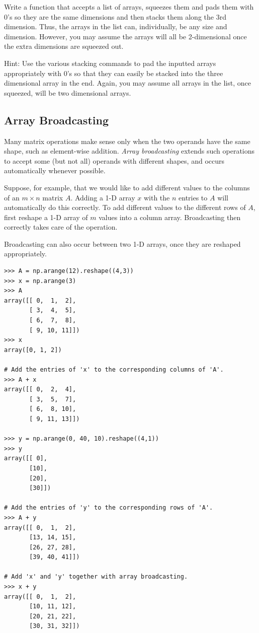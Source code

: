 \begin{problem}
Write a function that accepts a list of arrays, squeezes them and pads them with 0's so they are the same dimensions and then stacks them along the 3rd dimension. Thus, the arrays in the list can, individually, be any size and dimension. However, you may assume the arrays will all be 2-dimensional once the extra dimensions are squeezed out.

Hint: Use the various stacking commands to pad the inputted arrays appropriately with 0's so that they can easily be stacked into the three dimensional array in the end. Again, you may assume all arrays in the list, once squeezed, will be two dimensional arrays.
\end{problem}

\subsection*{Array Broadcasting} %

Many matrix operations make sense only when the two operands have the same shape, such as element-wise addition.
\emph{Array broadcasting} extends such operations to accept some (but not all) operands with different shapes, and occurs automatically whenever possible.

Suppose, for example, that we would like to add different values to the columns of an $m\times n$ matrix $A$.
Adding a 1-D array $x$ with the $n$ entries to $A$ will automatically do this correctly.
To add different values to the different rows of $A$, first reshape a 1-D array of $m$ values into a column array.
Broadcasting then correctly takes care of the operation.

Broadcasting can also occur between two 1-D arrays, once they are reshaped appropriately.

\begin{lstlisting}
>>> A = np.arange(12).reshape((4,3))
>>> x = np.arange(3)
>>> A
array([[ 0,  1,  2],
       [ 3,  4,  5],
       [ 6,  7,  8],
       [ 9, 10, 11]])
>>> x
array([0, 1, 2])

# Add the entries of 'x' to the corresponding columns of 'A'.
>>> A + x
array([[ 0,  2,  4],
       [ 3,  5,  7],
       [ 6,  8, 10],
       [ 9, 11, 13]])

>>> y = np.arange(0, 40, 10).reshape((4,1))
>>> y
array([[ 0],
       [10],
       [20],
       [30]])

# Add the entries of 'y' to the corresponding rows of 'A'.
>>> A + y
array([[ 0,  1,  2],
       [13, 14, 15],
       [26, 27, 28],
       [39, 40, 41]])

# Add 'x' and 'y' together with array broadcasting.
>>> x + y
array([[ 0,  1,  2],
       [10, 11, 12],
       [20, 21, 22],
       [30, 31, 32]])
\end{lstlisting}

